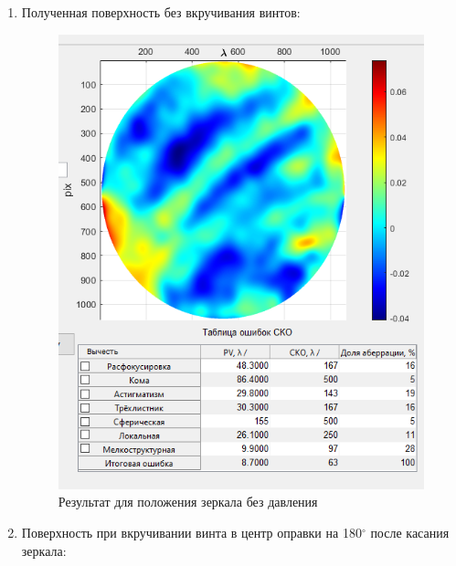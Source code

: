 \documentclass[a4paper, 12pt]{article}%
\begin{document}
	\begin{enumerate}
		\item Полученная поверхность без вкручивания винтов:
		
		\begin{figure}[H]
			\centering
			\includegraphics[width=0.9\linewidth]{wo.png}
			\caption{Результат для положения зеркала без давления}
		\end{figure}
		
		\item Поверхность при вкручивании винта в центр оправки на 180$^\circ$ после касания зеркала:


\end{enumerate}
\end{document}
